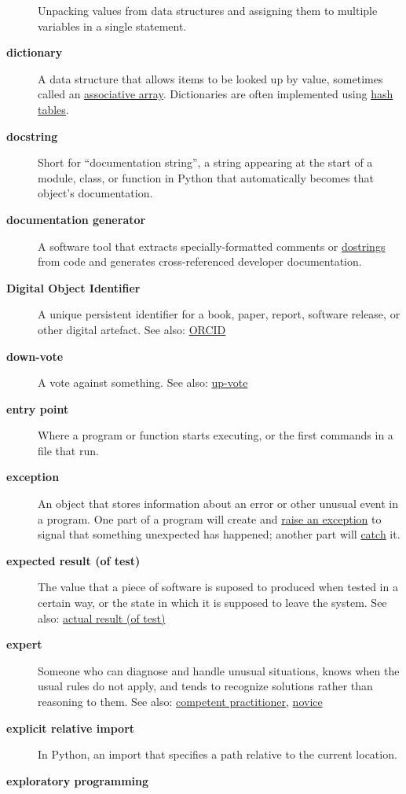 \documentclass[
]{krantz}
\begin{document}
\begin{description}
Unpacking values from data structures and assigning them to multiple variables in a single statement.
\item[\textbf{dictionary}]
A data structure that allows items to be looked up by value, sometimes called an \protect\hyperlink{associative_array}{associative array}. Dictionaries are often implemented using \protect\hyperlink{hash_table}{hash tables}.
\item[\textbf{docstring}]
Short for ``documentation string'', a string appearing at the start of a module, class, or function in Python that automatically becomes that object's documentation.
\item[\textbf{documentation generator}]
A software tool that extracts specially-formatted comments or \protect\hyperlink{docstring}{dostrings} from code and generates cross-referenced developer documentation.
\item[\textbf{Digital Object Identifier}]
A unique persistent identifier for a book, paper, report, software release, or other digital artefact. See also: \protect\hyperlink{orcid}{ORCID}
\item[\textbf{down-vote}]
A vote against something. See also: \protect\hyperlink{up_vote}{up-vote}
\item[\textbf{entry point}]
Where a program or function starts executing, or the first commands in a file that run.
\item[\textbf{exception}]
An object that stores information about an error or other unusual event in a program. One part of a program will create and \protect\hyperlink{raise_exception}{raise an exception} to signal that something unexpected has happened; another part will \protect\hyperlink{catch_exception}{catch} it.
\item[\textbf{expected result (of test)}]
The value that a piece of software is suposed to produced when tested in a certain way, or the state in which it is supposed to leave the system. See also: \protect\hyperlink{actual_result}{actual result (of test)}
\item[\textbf{expert}]
Someone who can diagnose and handle unusual situations, knows when the usual rules do not apply, and tends to recognize solutions rather than reasoning to them. See also: \protect\hyperlink{competent_practitioner}{competent practitioner}, \protect\hyperlink{novice}{novice}
\item[\textbf{explicit relative import}]
In Python, an import that specifies a path relative to the current location.
\item[\textbf{exploratory programming}]

\end{description}
\end{document}
